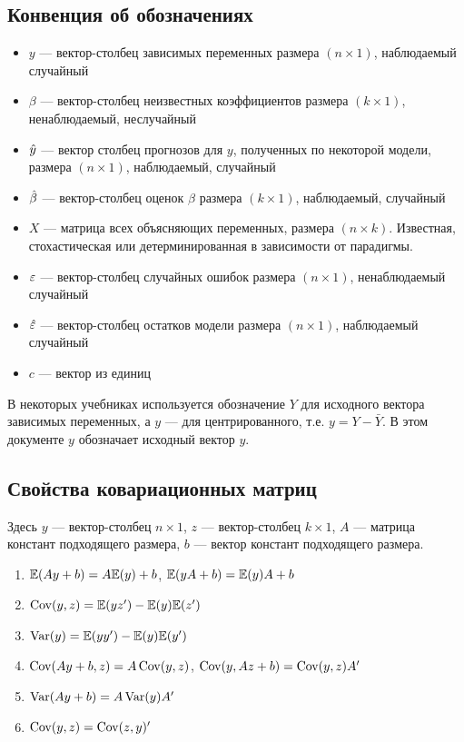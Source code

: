 \documentclass[12pt, a4paper]{article}\usepackage[]{graphicx}\usepackage[]{color}
\begin{document}
\subsection{Конвенция об обозначениях}

\begin{itemize}
\item $y$ — вектор-столбец зависимых переменных размера $(n \times 1)$, наблюдаемый случайный

\item $\beta$ — вектор-столбец неизвестных коэффициентов размера $(k \times 1)$, ненаблюдаемый, неслучайный

\item $\hat{y}$ — вектор столбец прогнозов для $y$, полученных по некоторой модели, размера $(n \times 1)$, наблюдаемый, случайный

\item $\hat{\beta}$ — вектор-столбец оценок $\beta$ размера $(k \times 1)$, наблюдаемый, случайный

\item $X$ — матрица всех объясняющих переменных, размера $(n \times k)$. Известная, стохастическая или детерминированная в зависимости от парадигмы.

\item $\varepsilon$ — вектор-столбец случайных ошибок размера $(n \times 1)$, ненаблюдаемый случайный

\item $\hat{\varepsilon}$ — вектор-столбец остатков модели размера $(n \times 1)$, наблюдаемый случайный

\item $c$ — вектор из единиц
\end{itemize}

В некоторых учебниках используется обозначение $Y$ для исходного вектора зависимых переменных, а $y$ — для центрированного, т.е.  $y=Y-\bar{Y}$. В этом документе $y$ обозначает исходный вектор $y$.


\subsection{Свойства ковариационных матриц}

Здесь $y$ — вектор-столбец $n\times 1$, $z$ — вектор-столбец $k\times 1$, $A$ — матрица констант подходящего размера, $b$ — вектор констант подходящего размера.

\begin{enumerate}
\item $\mathbb{E}(Ay+b)=A\mathbb{E}(y)+b$, $\mathbb{E}(yA+b)=\mathbb{E}(y)A+b$
\item $\operatorname{Cov}(y, z) = \mathbb{E}(yz') - \mathbb{E}(y)\mathbb{E}(z')$
\item $\operatorname{Var}(y) = \mathbb{E}(yy') - \mathbb{E}(y)\mathbb{E}(y')$
\item $\operatorname{Cov}(Ay + b, z) = A\operatorname{Cov}(y, z)$, $\operatorname{Cov}(y, Az + b) = \operatorname{Cov}(y, z) A'$
\item $\operatorname{Var}(Ay+b)=A\operatorname{Var}(y)A'$
\item $\operatorname{Cov}(y,z)=\operatorname{Cov}(z,y)'$
\end{enumerate}
\end{document}
